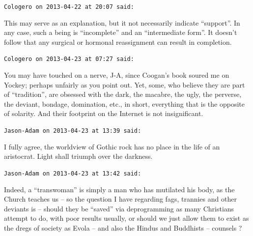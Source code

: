 \begin{footnotesize}
\begin{sffamily}
\hfill

\texttt{Cologero on 2013-04-22 at 20:07 said:}

This may serve as an explanation, but it not necessarily indicate ``support''. In any case, such a being is ``incomplete'' and an ``intermediate form''. It doesn't follow that any surgical or hormonal reassignment can result in completion.

\hfill

\texttt{Cologero on 2013-04-23 at 07:27 said:}

You may have touched on a nerve, J-A, since Coogan's book soured me on Yockey; perhaps unfairly as you point out. Yet, some, who believe they are part of ``tradition'', are obsessed with the dark, the macabre, the ugly, the perverse, the deviant, bondage, domination, etc., in short, everything that is the opposite of solarity. And their footprint on the Internet is not insignificant.

\hfill

\texttt{Jason-Adam on 2013-04-23 at 13:39 said:}

I fully agree, the worldview of Gothic rock has no place in the life of an aristocrat. Light shall triumph over the darkness.

\hfill

\texttt{Jason-Adam on 2013-04-23 at 13:42 said:}

Indeed, a ``transwoman'' is simply a man who has mutilated his body, as the Church teaches us -- so the question I have regarding fags, trannies and other deviants is -- should they be ``saved'' via deprogramming as many Christians attempt to do, with poor results usually, or should we just allow them to exist as the dregs of society as Evola -- and also the Hindus and Buddhists -- counsels ?

\end{sffamily}
\end{footnotesize}

